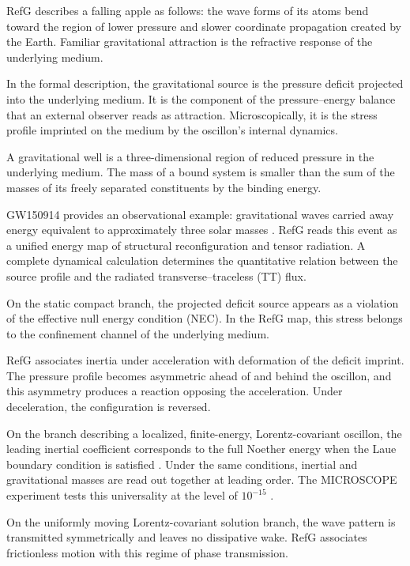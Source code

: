 \documentclass[11pt,a4paper]{article}
\begin{document}
RefG describes a falling apple as follows: the wave forms of its atoms bend toward the region of lower pressure and slower coordinate propagation created by the Earth. Familiar gravitational attraction is the refractive response of the underlying medium.

In the formal description, the gravitational source is the pressure deficit projected into the underlying medium. It is the component of the pressure--energy balance that an external observer reads as attraction. Microscopically, it is the stress profile imprinted on the medium by the oscillon's internal dynamics.

A gravitational well is a three-dimensional region of reduced pressure in the underlying medium. The mass of a bound system is smaller than the sum of the masses of its freely separated constituents by the binding energy.

GW150914 provides an observational example: gravitational waves carried away energy equivalent to approximately three solar masses \citep{abbott2016}. RefG reads this event as a unified energy map of structural reconfiguration and tensor radiation. A complete dynamical calculation determines the quantitative relation between the source profile and the radiated transverse--traceless (TT) flux.

On the static compact branch, the projected deficit source appears as a violation of the effective null energy condition (NEC). In the RefG map, this stress belongs to the confinement channel of the underlying medium.

RefG associates inertia under acceleration with deformation of the deficit imprint. The pressure profile becomes asymmetric ahead of and behind the oscillon, and this asymmetry produces a reaction opposing the acceleration. Under deceleration, the configuration is reversed.

On the branch describing a localized, finite-energy, Lorentz-covariant oscillon, the leading inertial coefficient corresponds to the full Noether energy when the Laue boundary condition is satisfied \citep{noether1918,laue1911}. Under the same conditions, inertial and gravitational masses are read out together at leading order. The MICROSCOPE experiment tests this universality at the level of $10^{-15}$ \citep{touboul2022}.

On the uniformly moving Lorentz-covariant solution branch, the wave pattern is transmitted symmetrically and leaves no dissipative wake. RefG associates frictionless motion with this regime of phase transmission.
\end{document}
